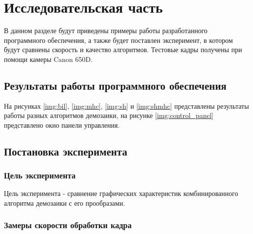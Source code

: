 \chapter{Исследовательская часть}

В данном разделе будут приведены примеры работы разработанного программного обеспечения, а также будет поставлен эксперимент, в котором будут сравнены скорость и качество алгоритмов. Тестовые кадры получены при помощи камеры Canon 650D. \cite{650d}

\section{Результаты работы программного обеспечения}

На рисунках \ref{img:bil}, \ref{img:mhc}, \ref{img:sh} и \ref{img:shmhc} представлены результаты работы разных алгоритмов демозаики, на рисунке \ref{img:control_panel} представлено окно панели управления.


\clearpage

\section{Постановка эксперимента}

\subsection{Цель эксперимента}

Цель эксперимента - сравнение графических характеристик комбинированного алгоритма демозаики с его прообразами.

\subsection{Замеры скорости обработки кадра}

\begin{table}[h]
	\begin{center}
		\caption{Скорость обработки кадра (в тиках).}
		\label{tbl:small}
	\end{center}
\end{table}


